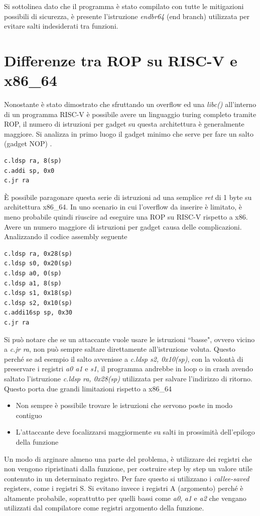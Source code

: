 Si sottolinea dato che il programma è stato compilato con tutte le mitigazioni possibili di sicurezza, è presente l'istruzione \textit{endbr64} (end branch) utilizzata per evitare salti indesiderati tra funzioni. 
\section*{Differenze tra ROP su RISC-V e x86\_64}
Nonostante è stato dimostrato che sfruttando un overflow ed una \textit{libc()} all'interno di un programma RISC-V è possibile avere un linguaggio turing completo tramite ROP, il numero di istruzioni per gadget su questa architettura è generalmente maggiore. Si analizza in primo luogo il gadget minimo che serve per fare un salto (gadget NOP) \cite{arxivRISCVROP}.
\begin{verbatim}
c.ldsp ra, 8(sp)
c.addi sp, 0x0
c.jr ra
\end{verbatim} 
È possibile paragonare questa serie di istruzioni ad una semplice \textit{ret} di 1 byte su architettura x86\_64. In uno scenario in cui l'overflow da inserire è limitato, è meno probabile quindi riuscire ad eseguire una ROP su RISC-V rispetto a x86. Avere un numero maggiore di istruzioni per gadget causa delle complicazioni. Analizzando il codice assembly seguente
\begin{verbatim}
c.ldsp ra, 0x28(sp)
c.ldsp s0, 0x20(sp)
c.ldsp a0, 0(sp)
c.ldsp a1, 8(sp)
c.ldsp s1, 0x18(sp)
c.ldsp s2, 0x10(sp)
c.addi16sp sp, 0x30
c.jr ra
\end{verbatim} 
Si può notare che se un attaccante vuole usare le istruzioni ``basse", ovvero vicino a \textit{c.jr ra}, non può sempre saltare direttamente all'istruzione voluta. Questo perché se ad esempio il salto avvenisse a \textit{c.ldsp s2, 0x10(sp)}, con la volontà di preservare i registri \textit{a0 a1} e \textit{s1}, il programma andrebbe in loop o in crash avendo saltato l'istruzione \textit{c.ldsp ra, 0x28(sp)} utilizzata per salvare l'indirizzo di ritorno. Questo porta due grandi limitazioni rispetto a x86\_64
\begin{itemize}
    \item Non sempre è possibile trovare le istruzioni che servono poste in modo contiguo
    \item L'attaccante deve focalizzarsi maggiormente su salti in prossimità dell'epilogo della funzione
\end{itemize}
Un modo di arginare almeno una parte del problema, è utilizzare dei registri che non vengono ripristinati dalla funzione, per costruire step by step un valore utile contenuto in un determinato registro. Per fare questo si utilizzano i \textit{callee-saved} registers, come i registri S. Si evitano invece i registri A (argomento) perché è altamente probabile, soprattutto per quelli bassi come \textit{a0}, \textit{a1} e \textit{a2} che vengano utilizzati dal compilatore come registri argomento della funzione.\\
